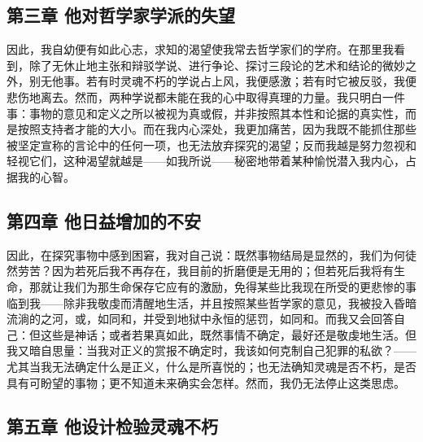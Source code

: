 \subsection{第三章 他对哲学家学派的失望}

因此，我自幼便有如此心志，求知的渴望使我常去哲学家们的学府。在那里我看到，除了无休止地主张和辩驳学说、进行争论、探讨三段论的艺术和结论的微妙之外，别无他事。若有时灵魂不朽的学说占上风，我便感激；若有时它被反驳，我便悲伤地离去。然而，两种学说都未能在我的心中取得真理的力量。我只明白一件事：事物的意见和定义之所以被视为真或假，并非按照其本性和论据的真实性，而是按照支持者才能的大小。而在我内心深处，我更加痛苦，因为我既不能抓住那些被坚定宣称的言论中的任何一项，也无法放弃探究的渴望；反而我越是努力忽视和轻视它们，这种渴望就越是——如我所说——秘密地带着某种愉悦潜入我内心，占据我的心智。\par


\subsection{第四章 他日益增加的不安}

因此，在探究事物中感到困窘，我对自己说：既然事物结局是显然的，我们为何徒然劳苦？因为若死后我不再存在，我目前的折磨便是无用的；但若死后我将有生命，那就让我们为那生命保存它应有的激励，免得某些比我现在所受的更悲惨的事临到我——除非我敬虔而清醒地生活，并且按照某些哲学家的意见，我被投入昏暗流淌的之河，或，如同和，并受到地狱中永恒的惩罚，如同和。而我又会回答自己：但这些是神话；或者若果真如此，既然事情不确定，最好还是敬虔地生活。但我又暗自思量：当我对正义的赏报不确定时，我该如何克制自己犯罪的私欲？——尤其当我无法确定什么是正义，什么是所喜悦的；也无法确知灵魂是否不朽，是否具有可盼望的事物；更不知道未来确实会怎样。然而，我仍无法停止这类思虑。\par


\subsection{第五章 他设计检验灵魂不朽}

